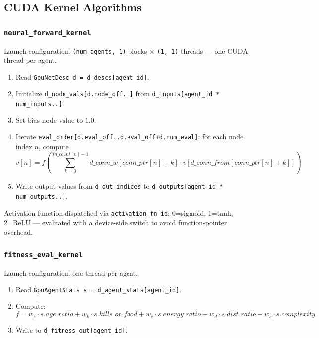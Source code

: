 \subsection{CUDA Kernel Algorithms}

\subsubsection{\texttt{neural\_forward\_kernel}}

Launch configuration: \texttt{(num\_agents, 1)} blocks × \texttt{(1, 1)} threads —
one CUDA thread per agent.

\begin{enumerate}[nosep]
  \item Read \texttt{GpuNetDesc d = d\_descs[agent\_id]}.
  \item Initialize \texttt{d\_node\_vals[d.node\_off..]} from \texttt{d\_inputs[agent\_id * num\_inputs..]}.
  \item Set bias node value to 1.0.
  \item Iterate \texttt{eval\_order[d.eval\_off..d.eval\_off+d.num\_eval]}:
    for each node index $n$, compute
    \[
      v[n] = f\!\left(\sum_{k=0}^{\mathit{in\_count}[n]-1}
             d\_conn\_w[\mathit{conn\_ptr}[n]+k] \cdot v[d\_conn\_from[\mathit{conn\_ptr}[n]+k]]\right)
    \]
  \item Write output values from \texttt{d\_out\_indices} to
    \texttt{d\_outputs[agent\_id * num\_outputs..]}.
\end{enumerate}

Activation function dispatched via \texttt{activation\_fn\_id}: 0=sigmoid, 1=tanh,
2=ReLU — evaluated with a device-side switch to avoid function-pointer overhead.

\subsubsection{\texttt{fitness\_eval\_kernel}}

Launch configuration: one thread per agent.

\begin{enumerate}[nosep]
  \item Read \texttt{GpuAgentStats s = d\_agent\_stats[agent\_id]}.
  \item Compute:
    \[
      f = w_s \cdot s.\mathit{age\_ratio}
        + w_k \cdot s.\mathit{kills\_or\_food}
        + w_e \cdot s.\mathit{energy\_ratio}
        + w_d \cdot s.\mathit{dist\_ratio}
        - w_c \cdot s.\mathit{complexity}
    \]
  \item Write to \texttt{d\_fitness\_out[agent\_id]}.
\end{enumerate}

